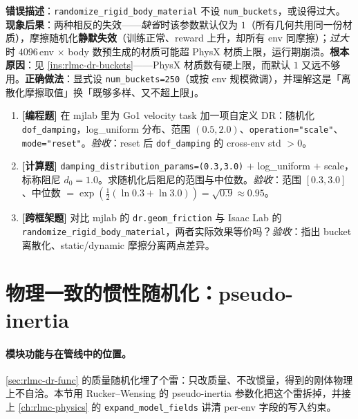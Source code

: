 \begin{pitfall}[Isaac Lab 的 \texttt{num\_buckets} 缺省（=1）或过大]
\textbf{错误描述}：\verb|randomize_rigid_body_material| 不设 \verb|num_buckets|，或设得过大。\textbf{现象后果}：两种相反的失效——\emph{缺省}时该参数默认仅为 $1$（所有几何共用同一份材质），摩擦随机化\textbf{静默失效}（训练正常、reward 上升，却所有 env 同摩擦）；\emph{过大}时 $4096$\,env $\times$ body 数预生成的材质可能超 PhysX 材质上限，运行期崩溃。\textbf{根本原因}：见 \cref{ins:rlmc-dr-buckets}——PhysX 材质数有硬上限，而默认 $1$ 又远不够用。\textbf{正确做法}：显式设 \verb|num_buckets=250|（或按 env 规模微调），并理解这是「离散化摩擦取值」换「既够多样、又不超上限」。
\end{pitfall}

\begin{practice}[本节练习]
\begin{enumerate}
  \item \textbf{[编程题]} 在 mjlab 里为 Go1 velocity task 加一项自定义 DR：随机化 \verb|dof_damping|，log\_uniform 分布、范围 $(0.5,2.0)$、\verb|operation="scale"|、\verb|mode="reset"|。\emph{验收}：reset 后 \verb|dof_damping| 的 cross-env std $>0$。
  \item \textbf{[计算题]} \verb|damping_distribution_params=(0.3,3.0)| $+$ log\_uniform $+$ scale，标称阻尼 $d_0=1.0$。求随机化后阻尼的范围与中位数。\emph{验收}：范围 $[0.3,3.0]$、中位数 $=\exp(\tfrac12(\ln 0.3+\ln 3.0))=\sqrt{0.9}\approx 0.95$。
  \item \textbf{[跨框架题]} 对比 mjlab 的 \verb|dr.geom_friction| 与 Isaac Lab 的 \verb|randomize_rigid_body_material|，两者实际效果等价吗？\emph{验收}：指出 bucket 离散化、static/dynamic 摩擦分离两点差异。
\end{enumerate}
\end{practice}

\section{物理一致的惯性随机化：pseudo-inertia}
\label{sec:rlmc-dr-inertia}

\paragraph{模块功能与在管线中的位置。}\cref{sec:rlmc-dr-func} 的质量随机化埋了个雷：只改质量、不改惯量，得到的刚体物理上不自洽。本节用 Rucker–Wensing 的 pseudo-inertia 参数化把这个雷拆掉，并接上 \cref{ch:rlmc-physics} 的 \verb|expand_model_fields| 讲清 per-env 字段的写入约束。

